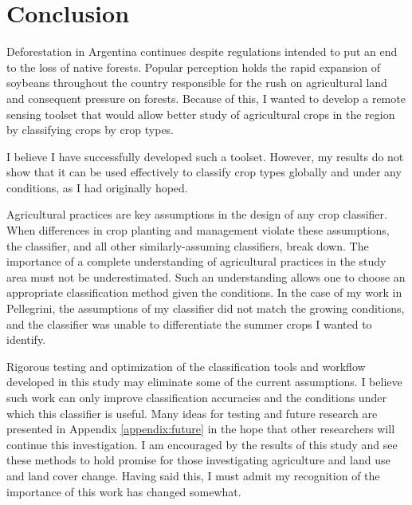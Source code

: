 \chapter{Conclusion}

Deforestation in Argentina continues despite regulations intended to put an end to the loss of native forests. Popular perception holds the rapid expansion of soybeans throughout the country responsible for the rush on agricultural land and consequent pressure on forests. Because of this, I wanted to develop a remote sensing toolset that would allow better study of agricultural crops in the region by classifying crops by crop types.

I believe I have successfully developed such a toolset. However, my results do not show that it can be used effectively to classify crop types globally and under any conditions, as I had originally hoped.

Agricultural practices are key assumptions in the design of any crop classifier. When differences in crop planting and management violate these assumptions, the classifier, and all other similarly-assuming classifiers, break down. The importance of a complete understanding of agricultural practices in the study area must not be underestimated. Such an understanding allows one to choose an appropriate classification method given the conditions. In the case of my work in Pellegrini, the assumptions of my classifier did not match the growing conditions, and the classifier was unable to differentiate the summer crops I wanted to identify.

Rigorous testing and optimization of the classification tools and workflow developed in this study may eliminate some of the current assumptions. I believe such work can only improve classification accuracies and the conditions under which this classifier is useful.  Many ideas for testing and future research are presented in Appendix \ref{appendix:future} in the hope that other researchers will continue this investigation. I am encouraged by the results of this study and see these methods to hold promise for those investigating agriculture and land use and land cover change. Having said this, I must admit my recognition of the importance of this work has changed somewhat.

